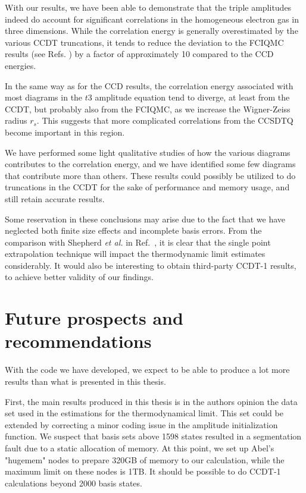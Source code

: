 With our results, we have been able to demonstrate that the triple amplitudes indeed do account for significant correlations in the homogeneous electron gas in three dimensions. While the correlation energy is generally overestimated by the various CCDT truncations, it tends to reduce the deviation to the FCIQMC results (see Refs. \cite{Shepherd2012, Leikanger2013}) by a factor of approximately 10 compared to the CCD energies. 

In the same way as for the CCD results, the correlation energy associated with most diagrams in the $t3$ amplitude equation tend to diverge, at least from the CCDT, but probably also from the FCIQMC, as we increase the Wigner-Zeiss radius $r_s$. This suggests that more complicated correlations from the CCSDTQ become important in this region. 

We have performed some light qualitative studies of how the various diagrams contributes to the correlation energy, and we have identified some few diagrams that contribute more than others. These results could possibly be utilized to do truncations in the CCDT for the sake of performance and memory usage, and still retain accurate results. 

Some reservation in these conclusions may arise due to the fact that we have neglected both finite size effects and incomplete basis errors. From the comparison with Shepherd \emph{et al.} in Ref.~\cite{Shepherd2013}, it is clear that the single point extrapolation technique will impact the thermodynamic limit estimates considerably. It would also be interesting to obtain third-party CCDT-1 results, to achieve better validity of our findings.

\section{Future prospects and recommendations}

With the code we have developed, we expect to be able to produce a lot more results than what is presented in this thesis. 

First, the main results produced in this thesis is in the authors opinion the data set used in the estimations for the thermodynamical limit. This set could be extended by correcting a minor coding issue in the amplitude initialization function. We suspect that basis sets above 1598 states resulted in a segmentation fault due to a static allocation of memory. At this point, we set up Abel's "hugemem" nodes to prepare 320GB of memory to our calculation, while the maximum limit on these nodes is 1TB. It should be possible to do CCDT-1 calculations beyond 2000 basis states.

